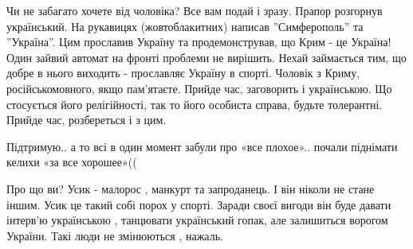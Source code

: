 \begin{itemize}

\obeycr
Чи не забагато хочете від чоловіка? Все вам подай і зразу.
Прапор розгорнув український. На рукавицях (жовтоблакитних) написав ''Симферополь'' та ''Україна''.
Цим прославив Україну та продемонстрував, що Крим - це Україна!
Один зайвий автомат на фронті проблеми не вирішить. Нехай займається тим, що добре в нього виходить - прославляє Україну в спорті.
Чоловік з Криму, російськомовного, якщо пам'ятаєте. Прийде час, заговорить і українською.
Що стосується його релігійності, так то його особиста справа, будьте толерантні. Прийде час, розбереться і з цим.
\restorecr


Підтримую.. а то всі в один момент забули про «все плохое».. почали піднімати
келихи «за все хорошее»((

Про що ви?
Усик - малорос , манкурт та запроданець.
І він ніколи не стане іншим.
Усик це такий собі порох у спорті.
Заради своєї вигоди він буде давати інтерв'ю українською , танцювати український гопак, але залишиться ворогом України.
Такі люди не змінюються , нажаль.

\end{itemize} %
